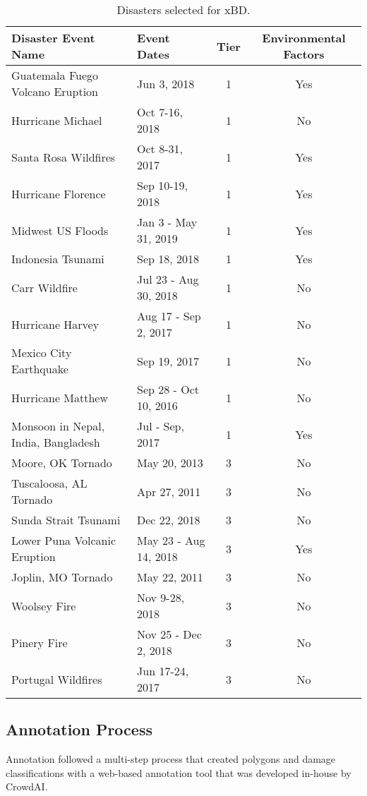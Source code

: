 \documentclass[10pt,twocolumn,letterpaper]{article}
\begin{document}
\begin{table*}
	\small
	\begin{tabularx}{2\columnwidth}{X|X|c|c}
		\hline
		\textbf{Disaster Event Name} & \textbf{Event Dates} & \textbf{Tier} & \textbf{Environmental Factors} \\
		\hline 
		Guatemala Fuego Volcano Eruption & Jun 3, 2018 & 1 & Yes \\ 
		\hline 
		Hurricane Michael & Oct 7-16, 2018 & 1 & No \\ 
		\hline 
		Santa Rosa Wildfires & Oct 8-31, 2017 & 1 & Yes\\ 
		\hline 
		Hurricane Florence & Sep 10-19, 2018 & 1 & Yes \\ 
		\hline 
		Midwest US Floods & Jan 3 - May 31, 2019 & 1 & Yes \\ 
		\hline 
		Indonesia Tsunami & Sep 18, 2018 & 1 & Yes \\ 
		\hline 
		Carr Wildfire & Jul 23 - Aug 30, 2018 & 1 & No \\ 
		\hline 
		Hurricane Harvey & Aug 17 - Sep 2, 2017 & 1 & No \\ 
		\hline 
		Mexico City Earthquake & Sep 19, 2017 & 1 & No \\ 
		\hline 
		Hurricane Matthew & Sep 28 - Oct 10, 2016 & 1 & No \\ 
		\hline 
		Monsoon in Nepal, India, Bangladesh & Jul - Sep, 2017 & 1 & Yes \\ 
		\hline
		Moore, OK Tornado & May 20, 2013 & 3 & No \\ 
		\hline
		Tuscaloosa, AL Tornado & Apr 27, 2011 & 3 & No \\ 
		\hline
		Sunda Strait Tsunami & Dec 22, 2018 & 3 & No \\ 
		\hline
		Lower Puna Volcanic Eruption & May 23 - Aug 14, 2018 & 3 & Yes \\ 
		\hline
		Joplin, MO Tornado & May 22, 2011 & 3 & No \\ 
		\hline
		Woolsey Fire & Nov 9-28, 2018 & 3 & No \\ 
		\hline
		Pinery Fire & Nov 25 - Dec 2, 2018 & 3 & No \\ 
		\hline
		Portugal Wildfires & Jun 17-24, 2017 & 3 & No \\ 
		\hline
	\end{tabularx}
	\caption{Disasters selected for xBD.}
	\label{table:disasters}
\end{table*}

\subsection{Annotation Process}
Annotation followed a multi-step process that  created polygons and damage classifications with a web-based annotation tool that was developed in-house by CrowdAI.
\end{document}
